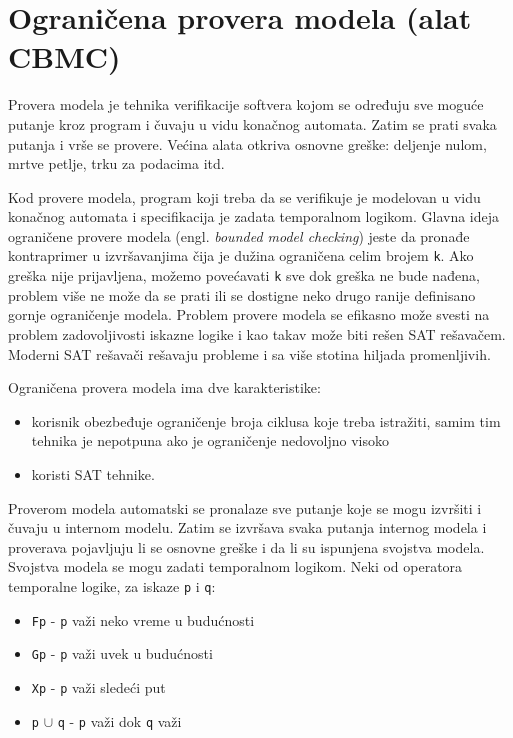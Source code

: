\section{Ograničena provera modela (alat CBMC)}\label{ograniux10dena-provera-modela-alat-cbmc}

Provera modela je tehnika verifikacije softvera kojom se određuju sve moguće putanje kroz program i čuvaju u vidu konačnog automata. Zatim se prati svaka putanja i vrše se provere. Većina alata otkriva osnovne greške: deljenje nulom, mrtve petlje, trku za podacima itd.

Kod provere modela, program koji treba da se verifikuje je modelovan u vidu konačnog automata i specifikacija je zadata temporalnom logikom. Glavna ideja ograničene provere modela (engl. \emph{bounded model checking}) jeste da pronađe kontraprimer u izvršavanjima čija je dužina ograničena celim brojem \texttt{k}. Ako greška nije prijavljena, možemo povećavati \texttt{k} sve dok greška ne bude nađena, problem više ne može da se prati ili se dostigne neko drugo ranije definisano gornje ograničenje modela. Problem provere modela se efikasno može svesti na problem zadovoljivosti iskazne logike i kao takav može biti rešen SAT rešavačem. Moderni SAT rešavači rešavaju probleme i sa više stotina hiljada promenljivih.

Ograničena provera modela ima dve karakteristike:

\begin{itemize}
\tightlist
\item
  korisnik obezbeđuje ograničenje broja ciklusa koje treba istražiti, samim tim tehnika je nepotpuna ako je ograničenje nedovoljno visoko
\item
  koristi SAT tehnike.
\end{itemize}

Proverom modela automatski se pronalaze sve putanje koje se mogu izvršiti i čuvaju u internom modelu. Zatim se izvršava svaka putanja internog modela i proverava pojavljuju li se osnovne greške i da li su ispunjena svojstva modela. Svojstva modela se mogu zadati temporalnom logikom. Neki od operatora temporalne logike, za iskaze \texttt{p} i \texttt{q}:

\begin{itemize}
\tightlist
\item
  \texttt{Fp} - \texttt{p} važi neko vreme u budućnosti
\item
  \texttt{Gp} - \texttt{p} važi uvek u budućnosti
\item
  \texttt{Xp} - \texttt{p} važi sledeći put
\item
  \texttt{p} $\cup$ \texttt{q} - \texttt{p} važi dok \texttt{q} važi
\end{itemize}


